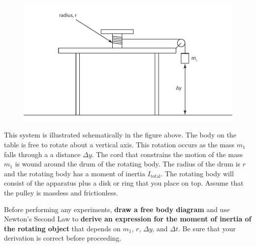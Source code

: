 \documentclass[11pt,letterpaper]{article}
\begin{document}
\begin{figure}[h]
\begin{center}
\includegraphics{./rotating_drum}
\end{center}
\label{fig:schematic}
\end{figure}

This system is illustrated schematically in the figure above.  The body on the table is free to rotate about a vertical axis. This rotation occurs as the mass $m_1$ falls through a a distance $\Delta{y}$. The cord that constrains the motion of the mass $m_1$ is wound around the drum of the rotating body. The radius of the drum is $r$ and the rotating body has a moment of inertia $I_{\mbox{total}}$. The rotating body will consist of the apparatus plus a disk or ring that you place on top. Assume that the pulley is massless and frictionless.

Before performing any experiments, \textbf{draw a free body diagram} and use Newton's Second Law to \textbf{derive an expression for the moment of inertia of the rotating object} that depends on $m_1$, $r$, $\Delta y$, and $\Delta t$. Be sure that your derivation is correct before proceeding.
\end{document}
